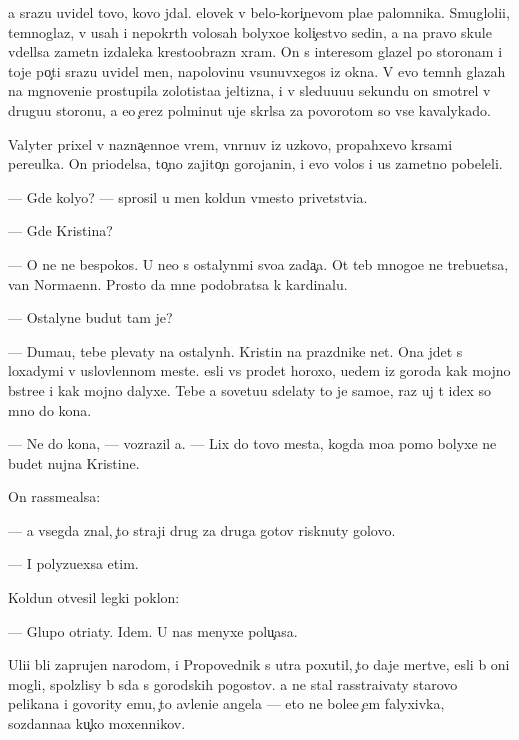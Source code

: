 \documentclass[10pt]{book}
\begin{document}
{\Y}a srazu uvidel tovo, kovo jdal. {\C}elovek v belo-kori{\c}nevom pla{\x}e palomnika. Smugloli{\q}i{\y}, temnoglaz{\yi}{\y}, v usah i nepokr{\yi}t{\yi}h volosah bolyxo{\y}e koli{\c}estvo sedin{\yi}, a na pravo{\y} skule v{\yi}del{\ia}lsa zametn{\yi}{\y} izdaleka krestoobrazn{\yi}{\y} xram. On s interesom glazel po storonam i toje po{\c}ti srazu uvidel men{\ia}, napolovinu v{\yi}sunuvxegos{\ia} iz okna. V {\y}evo temn{\yi}h glazah na mgnoveni{\y}e prostupila zolotista{\y}a jeltizna, i v sledu{\y}u{\x}u{\y}u sekundu on smotrel v drugu{\y}u storonu, a {\y}e{\x}o {\c}erez polminut{\yi} uje skr{\yi}lsa za povorotom so vse{\y} kavalykado{\y}.



Valyter prixel v nazna{\c}enno{\y}e vrem{\ia}, v{\yi}n{\yi}rnuv iz uzkovo, propahxevo kr{\yi}sami pereulka. On priodelsa, to{\c}no zajito{\c}n{\yi}{\y} gorojanin, i {\y}evo volos{\yi} i us{\yi} zametno pobeleli.

— Gde koly{\q}o? — sprosil u men{\ia} koldun vmesto privetstvi{\y}a.

— Gde Kristina?

— O ne{\y} ne bespoko{\y}s{\ia}. U ne{\y}o s ostalyn{\yi}mi svo{\y}a zada{\c}a. Ot teb{\ia} mnogo{\y}e ne trebu{\y}etsa, van Norma{\y}enn. Prosto da{\y} mne podobratsa k kardinalu.

— Ostalyn{\yi}{\y}e budut tam je?

— Duma{\y}u, tebe plevaty na ostalyn{\yi}h. Kristin{\yi} na prazdnike net. Ona jdet s loxadymi v uslovlennom meste. {\Y}esli vs{\e} pro{\y}det horoxo, u{\y}edem iz goroda kak mojno b{\yi}stre{\y}e i kak mojno dalyxe. Tebe {\y}a sovetu{\y}u sdelaty to je samo{\y}e, raz uj t{\yi} idex so mno{\y} do kon{\q}a.

— Ne do kon{\q}a, — vozrazil {\y}a. — Lix do tovo mesta, kogda mo{\y}a pomo{\x} bolyxe ne budet nujna Kristine.

On rassme{\y}alsa:

— {\Y}a vsegda znal, {\c}to straji drug za druga gotov{\yi} risknuty golovo{\y}.

— I polyzu{\y}exsa etim.

Koldun otvesil legki{\y} poklon:

— Glupo otri{\q}aty. Idem. U nas menyxe polu{\c}asa.

Uli{\q}i b{\yi}li zaprujen{\yi} narodom, i Propovednik s utra poxutil, {\c}to daje mertv{\yi}{\y}e, {\y}esli b{\yi} oni mogli, spolzlisy b{\yi} s{\iu}da s gorodskih pogostov. {\Y}a ne stal rasstra{\y}ivaty starovo pelikana i govority {\y}emu, {\c}to {\y}avleni{\y}e angela — eto ne bole{\y}e {\c}em falyxivka, sozdanna{\y}a ku{\c}ko{\y} moxennikov.
\end{document}
